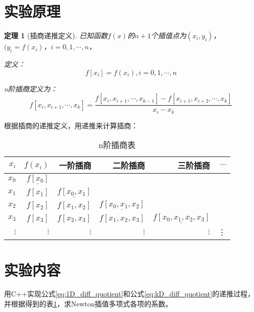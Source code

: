 \documentclass[hyperref,UTF8,c5size]{ctexart}
\newtheorem{thm}{定理}
\begin{document}
\section{实验原理}
        \begin{thm}[插商递推定义]
                已知函数$f(x)$的$n+1$个插值点为$(x_i, y_i)$，$(y_i = f(x_i)$，$i=0, 1, \cdots, n$，
                        
                定义：
                \begin{equation}\label{eq:1D_diff_quotient}
                    f[x_{i}] = f(x_{i}), i = 0, 1, \cdots , n
                \end{equation}

                n阶插商定义为：
                \begin{equation}\label{eq:kD_diff_quotient}
                    f[x_i, x_{i+1}, \cdots , x_k] =
                    \frac{f[x_i, x_{i+1}, \cdots , x_{k-1}] - f[x_{i+1}, x_{i+2}, \cdots , x_k]}{x_i - x_k}
                \end{equation}
        \end{thm}
        
        根据插商的递推定义，用递推来计算插商：
        \begin{table}[H]
                \centering
                \caption{n阶插商表}
	            \label{tab:diff_quotient}
                \begin{tabular}{r|r|r|r|r|r}
                \hline
                $x_i$ & $f(x_i)$ & 一阶插商 & 二阶插商 & 三阶插商  & $\cdots$  \\
                \hline
                $x_0$ & $\underline{f[x_0]}$ & & & & \\
                $x_1$ & $f[x_1]$ & $\underline{f[x_0,x_1]}$ & & &\\
                $x_2$ & $f[x_2]$ & $f[x_1,x_2]$ & $\underline{f[x_0,x_1,x_2]}$ & &\\
                $x_3$ & $f[x_3]$ & $f[x_2,x_3]$ & $f[x_1,x_2,x_3]$ & $\underline{f[x_0,x_1,x_2,x_3]}$ & \\
                \hline
                $\vdots$ & $\vdots$ & $\vdots$ & $\vdots$ & $\vdots$ & \vdots \\
                \end{tabular}
        \end{table}

\section{实验内容}
        用C++实现公式\eqref{eq:1D_diff_quotient}和公式\eqref{eq:kD_diff_quotient}的递推过程，
        并根据得到的表\ref{tab:diff_quotient}，求Newton插值多项式各项的系数。
\end{document}
